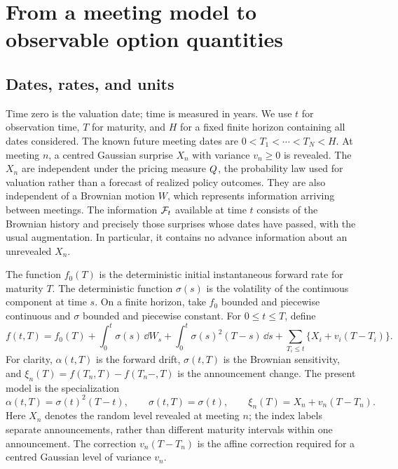 \section{From a meeting model to observable option quantities}\label{sec:prices}
\subsection{Dates, rates, and units}
Time zero is the valuation date; time is measured in years. We use $t$ for observation time, $T$ for maturity, and $H$ for a fixed finite horizon containing all dates considered. The known future meeting dates are $0<T_1<\cdots<T_N<H$. At meeting $n$, a centred Gaussian surprise $X_n$ with variance $v_n\geq0$ is revealed. The $X_n$ are independent under the pricing measure $Q$, the probability law used for valuation rather than a forecast of realized policy outcomes. They are also independent of a Brownian motion $W$, which represents information arriving between meetings. The information $\mathcal F_t$ available at time $t$ consists of the Brownian history and precisely those surprises whose dates have passed, with the usual augmentation. In particular, it contains no advance information about an unrevealed $X_n$.

The function $f_0(T)$ is the deterministic initial instantaneous forward rate for maturity $T$. The deterministic function $\sigma(s)$ is the volatility of the continuous component at time $s$. On a finite horizon, take $f_0$ bounded and piecewise continuous and $\sigma$ bounded and piecewise constant. For $0\leq t\leq T$, define
\begin{equation}\label{eq:curve}
f(t,T)=f_0(T)+\int_0^t\sigma(s)\,\dd W_s
 +\int_0^t\sigma(s)^2(T-s)\,\dd s
 +\sum_{T_i\leq t}\{X_i+v_i(T-T_i)\}.
\end{equation}
For clarity, $\alpha(t,T)$ is the forward drift, $\sigma(t,T)$ is the Brownian sensitivity, and $\xi_n(T)=f(T_n,T)-f(T_n-,T)$ is the announcement change. The present model is the specialization
\begin{equation}\label{eq:companion}
\alpha(t,T)=\sigma(t)^2(T-t),\qquad
\sigma(t,T)=\sigma(t),\qquad
\xi_n(T)=X_n+v_n(T-T_n).
\end{equation}
Here $X_n$ denotes the random level revealed at meeting $n$; the index labels separate announcements, rather than different maturity intervals within one announcement. The correction $v_n(T-T_n)$ is the affine correction required for a centred Gaussian level of variance $v_n$.

